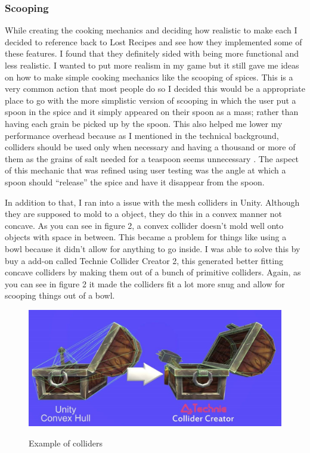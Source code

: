 \documentclass[10pt,twocolumn]{article}
\begin{document}
\subsubsection{Scooping}
While creating the cooking mechanics and deciding how realistic to make each I decided to reference back to Lost Recipes and see how they implemented some of these features. I found that they definitely sided with being more functional and less realistic. I wanted to put more realism in my game but it still gave me ideas on how to make simple cooking mechanics like the scooping of spices. This is a very common action that most people do so I decided this would be a appropriate place to go with the more simplistic version of scooping in which the user put a spoon in the spice and it simply appeared on their spoon as a mass; rather than having each grain be picked up by the spoon. This also helped me lower my performance overhead because as I mentioned in the technical background, colliders should be used only when necessary and having a thousand or more of them as the grains of salt needed for a teaspoon seems unnecessary \cite{introCollisionUnity2022}. The aspect of this mechanic that was refined using user testing was the angle at which a spoon should “release” the spice and have it disappear from the spoon.\par 

In addition to that, I ran into a issue with the mesh colliders in Unity. Although they are supposed to mold to a object, they do this in a convex manner not concave. As you can see in figure 2, a convex collider doesn't mold well onto objects with space in between. This became a problem for things like using a bowl because it didn't allow for anything to go inside. I was able to solve this by buy a add-on called Technie Collider Creator 2\cite{techie2022}, this generated better fitting concave colliders by making them out of a bunch of primitive colliders. Again, as you can see in figure 2 it made the colliders fit a lot more snug and allow for scooping things out of a bowl. \par
\begin{figure}[h]
\caption{Example of colliders}
\centering
\includegraphics[scale=.2]{collider.jpg} \cite{techie2022}
\end{figure}
\end{document}
